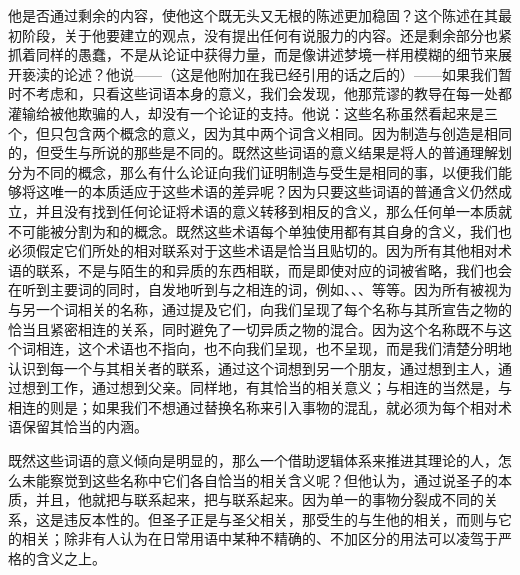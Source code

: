 他是否通过剩余的内容，使他这个既无头又无根的陈述更加稳固？这个陈述在其最初阶段，关于他要建立的观点，没有提出任何有说服力的内容。还是剩余部分也紧抓着同样的愚蠢，不是从论证中获得力量，而是像讲述梦境一样用模糊的细节来展开亵渎的论述？他说——（这是他附加在我已经引用的话之后的）——如果我们暂时不考虑和，只看这些词语本身的意义，我们会发现，他那荒谬的教导在每一处都灌输给被他欺骗的人，却没有一个论证的支持。他说：这些名称虽然看起来是三个，但只包含两个概念的意义，因为其中两个词含义相同。因为制造与创造是相同的，但受生与所说的那些是不同的。既然这些词语的意义结果是将人的普通理解划分为不同的概念，那么有什么论证向我们证明制造与受生是相同的事，以便我们能够将这唯一的本质适应于这些术语的差异呢？因为只要这些词语的普通含义仍然成立，并且没有找到任何论证将术语的意义转移到相反的含义，那么任何单一本质就不可能被分割为和的概念。既然这些术语每个单独使用都有其自身的含义，我们也必须假定它们所处的相对联系对于这些术语是恰当且贴切的。因为所有其他相对术语的联系，不是与陌生的和异质的东西相联，而是即使对应的词被省略，我们也会在听到主要词的同时，自发地听到与之相连的词，例如、、、等等。因为所有被视为与另一个词相关的名称，通过提及它们，向我们呈现了每个名称与其所宣告之物的恰当且紧密相连的关系，同时避免了一切异质之物的混合。因为这个名称既不与这个词相连，这个术语也不指向，也不向我们呈现，也不呈现，而是我们清楚分明地认识到每一个与其相关者的联系，通过这个词想到另一个朋友，通过想到主人，通过想到工作，通过想到父亲。同样地，有其恰当的相关意义；与相连的当然是，与相连的则是；如果我们不想通过替换名称来引入事物的混乱，就必须为每个相对术语保留其恰当的内涵。\par

既然这些词语的意义倾向是明显的，那么一个借助逻辑体系来推进其理论的人，怎么未能察觉到这些名称中它们各自恰当的相关含义呢？但他认为，通过说圣子的本质，并且，他就把与联系起来，把与联系起来。因为单一的事物分裂成不同的关系，这是违反本性的。但圣子正是与圣父相关，那受生的与生他的相关，而则与它的相关；除非有人认为在日常用语中某种不精确的、不加区分的用法可以凌驾于严格的含义之上。\par

